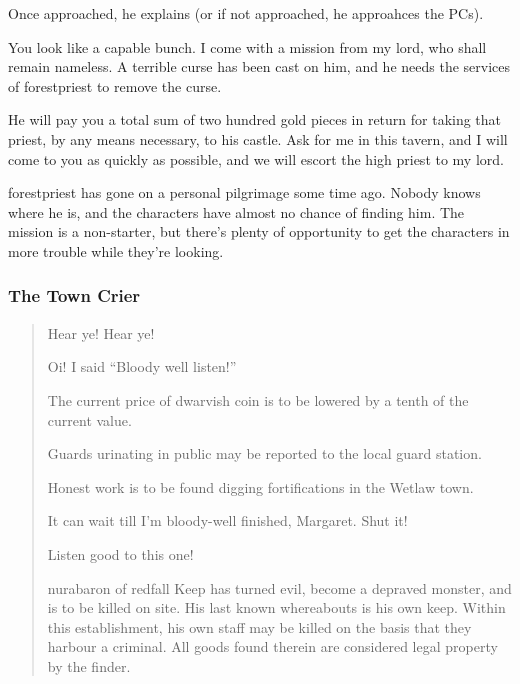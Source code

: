 Once approached, he explains (or if not approached, he approahces the PCs).

\begin{speechtext}
	You look like a capable bunch.  I come with a mission from my lord, who shall remain nameless.  A terrible curse has been cast on him, and he needs the services of \gls{forestpriest} to remove the curse.

	He will pay you a total sum of two hundred gold pieces in return for taking that priest, by any means necessary, to his castle.  Ask for me in this tavern, and I will come to you as quickly as possible, and we will escort the high priest to my lord.
\end{speechtext}

\gls{forestpriest} has gone on a personal pilgrimage some time ago.  Nobody knows where he is, and the characters have almost no chance of finding him.  The mission is a non-starter, but there's plenty of opportunity to get the characters in more trouble while they're looking.

\label{nathaniel}
\humandiplomat

\subsubsection{The Town Crier}
\begin{boxtext}
	\begin{verse}
		Hear ye! Hear ye!

		Oi! I said ``Bloody well listen!''

		The current price of dwarvish coin is to be lowered by a tenth of the current value.

		Guards urinating in public may be reported to the local guard station.

		Honest work is to be found digging fortifications in the Wetlaw town.

		It can wait till I'm bloody-well finished, Margaret.  Shut it!

		Listen good to this one!

		\gls{nurabaron} of \gls{redfall} Keep has turned evil, become a depraved monster, and is to be killed on site.  His last known whereabouts is his own keep.  Within this establishment, his own staff may be killed on the basis that they harbour a criminal.  All goods found therein are considered legal property by the finder.


	\end{verse}
\end{boxtext}

